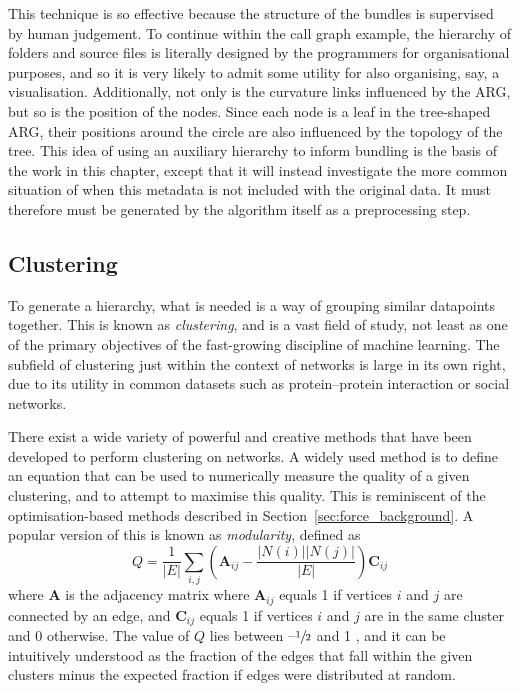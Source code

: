 This technique is so effective because the structure of the bundles is supervised by human judgement. To continue within the call graph example, the hierarchy of folders and source files is literally designed by the programmers for organisational purposes, and so it is very likely to admit some utility for also organising, say, a visualisation.
Additionally, not only is the curvature links influenced by the ARG, but so is the position of the nodes. Since each node is a leaf in the tree-shaped ARG, their positions around the circle are also influenced by the topology of the tree.
This idea of using an auxiliary hierarchy to inform bundling is the basis of the work in this chapter, except that it will instead investigate the more common situation of when this metadata is not included with the original data. It must therefore must be generated by the algorithm itself as a preprocessing step.

\subsection{Clustering}
\label{sec:clustering_background}
To generate a hierarchy, what is needed is a way of grouping similar datapoints together. This is known as \textit{clustering}, and is a vast field of study, not least as one of the primary objectives of the fast-growing discipline of machine learning. The subfield of clustering just within the context of networks is large in its own right, due to its utility in common datasets such as protein--protein interaction or social networks.

There exist a wide variety of powerful and creative methods that have been developed to perform clustering on networks. A widely used method is to define an equation that can be used to numerically measure the quality of a given clustering, and to attempt to maximise this quality. This is reminiscent of the optimisation-based methods described in Section~\ref{sec:force_background}.
A popular version of this is known as \emph{modularity}, defined as
\begin{equation}
  Q = \frac{1}{|E|}\sum_{i,j}\left(\mathbf{A}_{ij} - \frac{|N(i)||N(j)|}{|E|}\right)\mathbf{C}_{ij}
  \label{eq:modularity}
\end{equation}
where $\mathbf{A}$ is the adjacency matrix where $\mathbf{A}_{ij}$ equals 1 if vertices $i$ and $j$ are connected by an edge, and $\mathbf{C}_{ij}$ equals 1 if vertices $i$ and $j$ are in the same cluster and 0 otherwise.
The value of $Q$ lies between $\text{--}\sfrac{1}{2}$ and 1 \citep{Brandes2007Modularity}, and it can be intuitively understood as the fraction of the edges that fall within the given clusters minus the expected fraction if edges were distributed at random.

